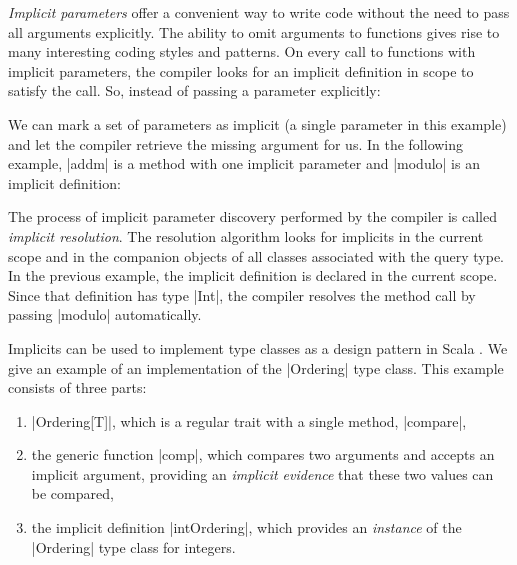\emph{Implicit parameters} offer a convenient way to write code without the need to pass all arguments explicitly.
The ability to omit arguments to functions gives rise to many interesting coding styles and patterns.
On every call to functions with implicit parameters, the compiler looks for an implicit definition in scope to satisfy the call.
So, instead of passing a parameter explicitly:

\explicitModuloCodeSection

We can mark a set of parameters as implicit (a single parameter in this example) and let the compiler retrieve the missing argument for us.
In the following example, |addm| is a method with one implicit parameter and |modulo| is an implicit definition:

\implicitModuloCodeSection

The process of implicit parameter discovery performed by the compiler is called \emph{implicit resolution}.
The resolution algorithm looks for implicits in the current scope and in the companion objects of all classes associated with the query type.
In the previous example, the implicit definition is declared in the current scope.
Since that definition has type |Int|, the compiler resolves the method call by passing |modulo| automatically.

Implicits can be used to implement type classes \citep{wadler1989howto} as a design pattern in Scala \citep{oliveira2010type}.
We give an example of an implementation of the |Ordering| type class.
This example consists of three parts:

\begin{enumerate}
  \item |Ordering[T]|, which is a regular trait with a single method, |compare|,
  \item the generic function |comp|, which compares two arguments and accepts an implicit argument, providing an \emph{implicit evidence} that these two values can be compared,
  \item the implicit definition |intOrdering|, which provides an \emph{instance} of the |Ordering| type class for integers.
\end{enumerate}

\ordExampleCodeSection



